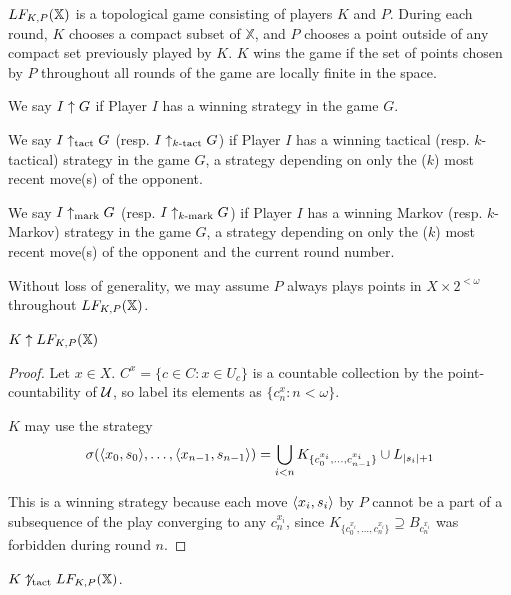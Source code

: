 \begin{definition}
$LF_{K,P}(\mathbb{X})$ is a topological game consisting of players $K$ and $P$. During each round, $K$ chooses a compact subset of $\mathbb{X}$, and $P$ chooses a point outside of any compact set previously played by $K$. $K$ wins the game if the set of points chosen by $P$ throughout all rounds of the game are locally finite in the space.
\end{definition}

\begin{definition}
We say $I \uparrow G$ if Player $I$ has a winning strategy in the game $G$.

We say $I \uparrow_{\text{tact}} G$ (resp. $I \uparrow_{k\text{-tact}} G$) if Player $I$ has a winning tactical (resp. $k$-tactical) strategy in the game $G$, a strategy depending on only the ($k$) most recent move(s) of the opponent.

We say $I \uparrow_{\text{mark}} G$ (resp. $I \uparrow_{k\text{-mark}} G$) if Player $I$ has a winning Markov (resp. $k$-Markov) strategy in the game $G$, a strategy depending on only the ($k$) most recent move(s) of the opponent and the current round number.
\end{definition}

\begin{proposition}
Without loss of generality, we may assume $P$ always plays points in $X \times 2^{<\omega}$ throughout $LF_{K,P}(\mathbb{X})$.
\end{proposition}

\begin{proposition}
$K \uparrow LF_{K,P}(\mathbb{X})$
\end{proposition}

\begin{proof}
Let $x\in X$. $C^x = \{c \in C : x \in U_c\}$ is a countable collection by the point-countability of $\mathcal{U}$, so label its elements as $\{c^x_n: n<\omega\}$.

$K$ may use the strategy 
  \[
    \sigma(\langle x_0,s_0\rangle,\dots,\langle x_{n-1},s_{n-1}\rangle) = 
    \bigcup_{i < n} K_{\{c^{x_i}_0,\dots,c^{x_i}_{n-1}\}} \cup L_{|s_i|+1}
  \]

This is a winning strategy because each move $\langle x_i,s_i\rangle$ by $P$ cannot be a part of a subsequence of the play converging to any $c^{x_i}_n$, since $K_{\{c^{x_i}_0,\dots,c^{x_i}_n\}} \supseteq B_{c^{x_i}_n}$ was forbidden during round $n$.
\end{proof}

\begin{theorem}
$K\not\uparrow_{\text{tact}}LF_{K,P}(\mathbb{X})$.
\end{theorem}

